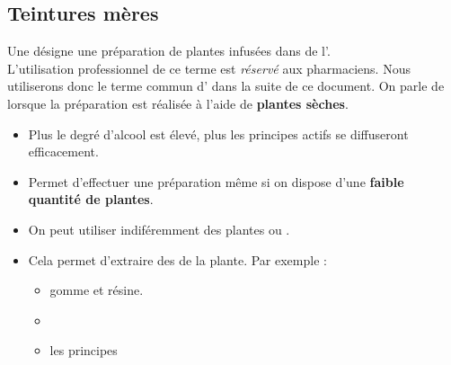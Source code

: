 \subsection{Teintures mères}

\begin{Defi}
    Une  désigne une préparation de plantes infusées dans de l'. \\
    L'utilisation professionnel de ce terme est \textit{réservé} aux pharmaciens. Nous utiliserons donc le terme commun d' dans la suite de ce document.
    On parle de  lorsque la préparation est réalisée à l'aide de \textbf{plantes sèches}. 
\end{Defi}
\begin{Remarque}[]%
    \begin{itemize}[label=\faPen]
        \item Plus le degré d'alcool est élevé, plus les principes actifs se diffuseront efficacement. 
        \item Permet d'effectuer une préparation même si on dispose d'une \textbf{faible quantité de plantes}. 
        \item On peut utiliser indiféremment des plantes  ou .
        \item Cela permet d'extraire des   de la plante. Par exemple :
                \begin{multicols}{3}
                    \begin{itemize}
                        \item gomme et résine.
                        \item {}
                        \item les principes 
                    \end{itemize}
                \end{multicols}
    \end{itemize}
\end{Remarque}
